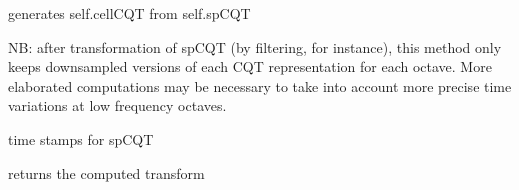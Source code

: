 \documentclass[letterpaper,10pt,english]{sphinxmanual}
\begin{document}
\begin{fulllineitems}
\begin{fulllineitems}
\end{fulllineitems}


\begin{fulllineitems}
\label{reference/tftransforms:pyfasst.tftransforms.minqt.CQTransfo.spCQT2CellCQT}
generates self.cellCQT from self.spCQT

NB: after transformation of spCQT (by filtering, for instance),
this method only keeps downsampled versions of each CQT representation
for each octave. More elaborated computations may be necessary to
take into account more precise time variations at low frequency
octaves.

\end{fulllineitems}


\begin{fulllineitems}
\label{reference/tftransforms:pyfasst.tftransforms.minqt.CQTransfo.time_stamps}
time stamps for spCQT

\end{fulllineitems}


\begin{fulllineitems}
\label{reference/tftransforms:pyfasst.tftransforms.minqt.CQTransfo.transfo}
returns the computed transform

\end{fulllineitems}


\end{fulllineitems}

\end{document}
